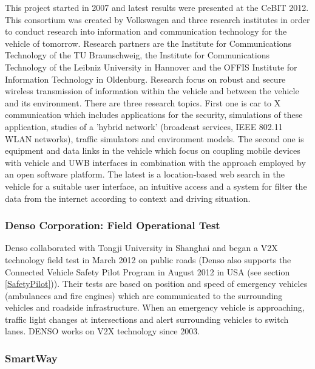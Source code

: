 \documentclass[a4paper]{article}
\begin{document}
This project \cite{C3World} started in 2007 and latest results were presented at the CeBIT 2012. This consortium was created by Volkswagen and three research institutes in order to conduct research into information and communication technology for the vehicle of tomorrow. Research partners are the Institute for Communications Technology of the TU Braunschweig, the Institute for Communications Technology of the Leibniz University in Hannover and the OFFIS Institute for Information Technology in Oldenburg. Research focus on robust and secure wireless transmission of information within the vehicle and between the vehicle and its environment. There are three research topics. First one is car to X communication which includes applications for the security, simulations of these application, studies of a 'hybrid network' (broadcast services, IEEE 802.11 WLAN networks), traffic simulators and environment models. The second one is equipment and data links in the vehicle which focus on coupling mobile devices with vehicle and UWB interfaces in combination with the approach employed by an open software platform. The latest is a location-based web search in the vehicle for a suitable user interface, an intuitive access and a system for filter the data from the internet according to context and driving situation.

\subsubsection{Denso Corporation: Field Operational Test}

Denso collaborated \cite{Denso} with Tongji University in Shanghai and began a V2X technology field test in March 2012 on public roads (Denso also supports the Connected Vehicle Safety Pilot Program in August 2012 in USA (see section \ref{SafetyPilot})). Their tests are based on position and speed of emergency vehicles (ambulances and fire engines) which are communicated to the surrounding vehicles and roadside infrastructure. When an emergency vehicle is approaching, traffic light changes at intersections and alert surrounding vehicles to switch lanes. DENSO works on V2X technology since 2003. 


\subsubsection{SmartWay}
\end{document}

